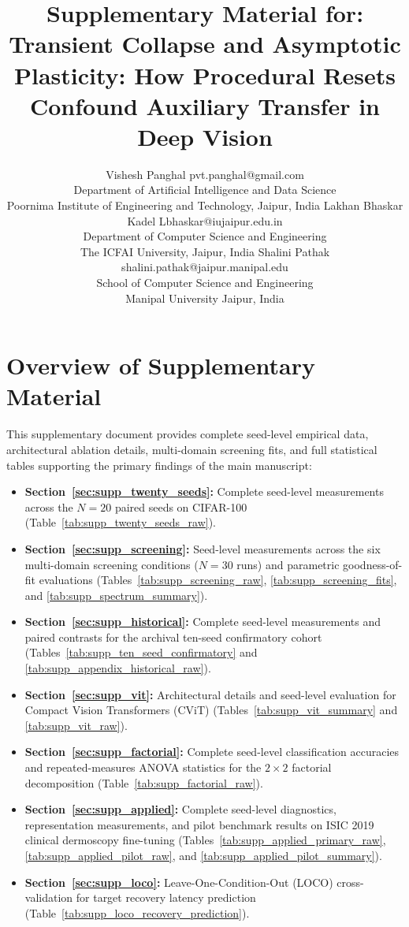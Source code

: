 \documentclass[10pt]{article}
\title{Supplementary Material for:\\
Transient Collapse and Asymptotic Plasticity: How Procedural Resets Confound Auxiliary Transfer in Deep Vision}
\author{\name Vishesh Panghal \email pvt.panghal@gmail.com \\
      \addr Department of Artificial Intelligence and Data Science\\
      Poornima Institute of Engineering and Technology, Jaipur, India
      \AND
      \name Lakhan Bhaskar Kadel \email Lbhaskar@iujaipur.edu.in \\
      \addr Department of Computer Science and Engineering\\
      The ICFAI University, Jaipur, India
      \AND
      \name Shalini Pathak \email shalini.pathak@jaipur.manipal.edu \\
      \addr School of Computer Science and Engineering\\
      Manipal University Jaipur, India}
\begin{document}
\maketitle

\appendix
\renewcommand{\thetable}{S\arabic{table}}
\renewcommand{\thefigure}{S\arabic{figure}}
\setcounter{table}{0}
\setcounter{figure}{0}

\section*{Overview of Supplementary Material}
This supplementary document provides complete seed-level empirical data, architectural ablation details, multi-domain screening fits, and full statistical tables supporting the primary findings of the main manuscript:
\begin{itemize}
    \item \textbf{Section~\ref{sec:supp_twenty_seeds}:} Complete seed-level measurements across the $N = 20$ paired seeds on CIFAR-100 (Table~\ref{tab:supp_twenty_seeds_raw}).
    \item \textbf{Section~\ref{sec:supp_screening}:} Seed-level measurements across the six multi-domain screening conditions ($N = 30$ runs) and parametric goodness-of-fit evaluations (Tables~\ref{tab:supp_screening_raw}, \ref{tab:supp_screening_fits}, and \ref{tab:supp_spectrum_summary}).
    \item \textbf{Section~\ref{sec:supp_historical}:} Complete seed-level measurements and paired contrasts for the archival ten-seed confirmatory cohort (Tables~\ref{tab:supp_ten_seed_confirmatory} and \ref{tab:supp_appendix_historical_raw}).
    \item \textbf{Section~\ref{sec:supp_vit}:} Architectural details and seed-level evaluation for Compact Vision Transformers (CViT) (Tables~\ref{tab:supp_vit_summary} and \ref{tab:supp_vit_raw}).
    \item \textbf{Section~\ref{sec:supp_factorial}:} Complete seed-level classification accuracies and repeated-measures ANOVA statistics for the $2 \times 2$ factorial decomposition (Table~\ref{tab:supp_factorial_raw}).
    \item \textbf{Section~\ref{sec:supp_applied}:} Complete seed-level diagnostics, representation measurements, and pilot benchmark results on ISIC 2019 clinical dermoscopy fine-tuning (Tables~\ref{tab:supp_applied_primary_raw}, \ref{tab:supp_applied_pilot_raw}, and \ref{tab:supp_applied_pilot_summary}).
    \item \textbf{Section~\ref{sec:supp_loco}:} Leave-One-Condition-Out (LOCO) cross-validation for target recovery latency prediction (Table~\ref{tab:supp_loco_recovery_prediction}).
\end{itemize}
\end{document}
